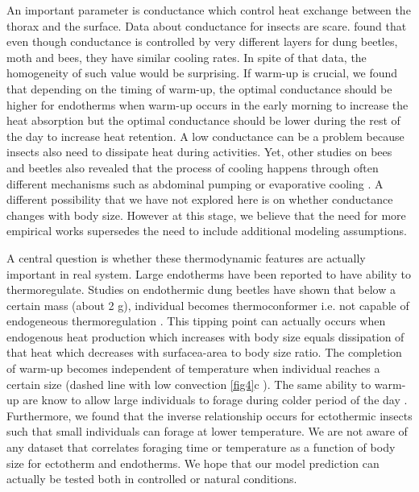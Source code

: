 An important parameter is conductance which control heat exchange between the thorax and the surface.
Data about conductance for insects are scare.
\citet{Bartholomew1978} found that even though conductance is controlled by very different layers for dung beetles, moth and bees, they have similar cooling rates. %
In spite of that data, the homogeneity of such value would be surprising. %
If warm-up is crucial, we found that depending on the timing of warm-up, the optimal conductance should be higher for endotherms when warm-up occurs in the early morning  to increase the heat absorption but the optimal conductance should be lower during the rest of the day to increase heat retention.
A low conductance  can be a problem because insects also need to dissipate heat during activities.
Yet, other studies on bees and beetles also revealed that the process of cooling happens through often different mechanisms such as abdominal pumping or evaporative cooling \citep{Heinrich1979, Verdu2012}.
A different possibility that we have not explored here is on whether conductance changes with body size.
However at this stage, we believe that the need for more empirical works supersedes the need to include additional modeling assumptions.

A central question is whether these thermodynamic features are actually important in real system.  
Large endotherms have been reported to have ability to thermoregulate. 
Studies on endothermic dung beetles have shown that below a certain mass (about 2 g), individual becomes thermoconformer i.e. not capable of endogeneous thermoregulation \citep{Bartholomew1978, Verdu2006}. 
This tipping point can actually occurs when endogenous heat production which increases with body size equals dissipation of that heat which decreases with surfacea-area to body size ratio.
The completion of warm-up becomes independent of temperature when individual reaches a certain size (dashed line with low convection \cref{fig4}c ).
The same ability to warm-up are know to allow large individuals to forage during colder period of the day \citep{May1985}.
Furthermore, we found that the inverse relationship occurs for ectothermic insects such that small individuals can forage at lower temperature.
We are not aware of any dataset that correlates foraging time or temperature as a function of body size for ectotherm and endotherms.
We hope that our model prediction can actually be tested both in controlled or natural conditions. 

